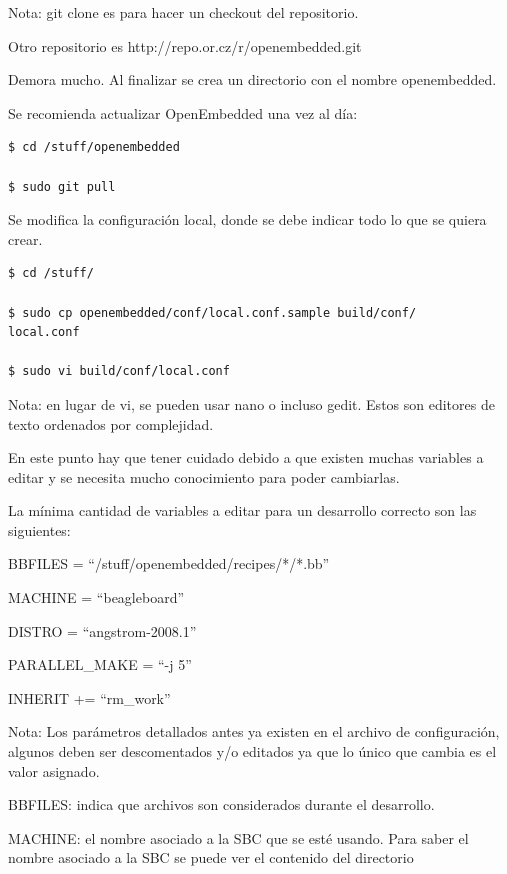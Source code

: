 Nota: git clone es para hacer un checkout del repositorio. 

Otro repositorio es http://repo.or.cz/r/openembedded.git

\bigskip
Demora mucho. Al finalizar se crea un directorio con el nombre openembedded.

\bigskip
Se recomienda actualizar OpenEmbedded una vez al día:

\begin{verbatim}
$ cd /stuff/openembedded

$ sudo git pull
\end{verbatim}

\newpage
{}

\bigskip
Se modifica la configuración local, donde se debe indicar todo lo que se quiera crear.

\begin{verbatim}
$ cd /stuff/

$ sudo cp openembedded/conf/local.conf.sample build/conf/
local.conf

$ sudo vi build/conf/local.conf
\end{verbatim}

Nota: en lugar de vi, se pueden usar nano o incluso gedit. Estos son editores de texto ordenados por complejidad.

\bigskip
En este punto hay que tener cuidado debido a que existen muchas variables a editar y se necesita mucho conocimiento para poder cambiarlas.


La mínima cantidad de variables a editar para un desarrollo correcto son las siguientes:

\bigskip
BBFILES = “/stuff/openembedded/recipes/*/*.bb”

MACHINE = “beagleboard”

DISTRO = “angstrom-2008.1”

PARALLEL\_MAKE = “-j 5”

INHERIT += “rm\_work”

\bigskip
Nota: Los parámetros detallados antes ya existen en el archivo de configuración, algunos deben ser descomentados y/o editados ya que lo único que cambia es el valor asignado.

\bigskip
BBFILES: indica que archivos son considerados durante el desarrollo.

\bigskip
MACHINE: el nombre asociado a la SBC que se esté usando. Para saber el nombre asociado a la SBC se puede ver el contenido del directorio


